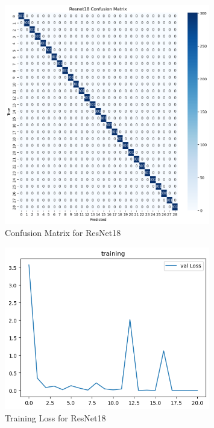 \documentclass[12pt, a4paper]{article}
\begin{document}
\begin{figure}[H]
    \centering
    \includegraphics[width=0.8\textwidth]{../../plots/ResNet18_ConfusionMatrix.png}
    \caption{Confusion Matrix for ResNet18}
    \label{fig:resnet18_confusion_matrix}
\end{figure}
\begin{figure}[H]
    \centering
    \includegraphics[width=0.8\textwidth]{../../plots/ResNet18_training.png}
    \caption{Training Loss for ResNet18}
    \label{fig:resnet18_training_loss}
\end{figure}


\end{document}
